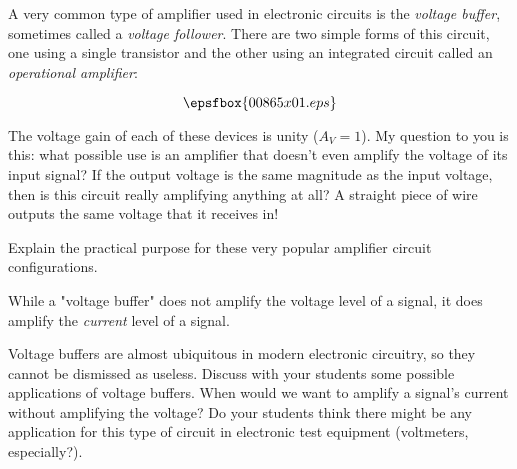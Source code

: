 

A very common type of amplifier used in electronic circuits is the {\it voltage buffer}, sometimes called a {\it voltage follower}.  There are two simple forms of this circuit, one using a single transistor and the other using an integrated circuit called an {\it operational amplifier}:

$$\epsfbox{00865x01.eps}$$

The voltage gain of each of these devices is unity ($A_V = 1$).  My question to you is this: what possible use is an amplifier that doesn't even amplify the voltage of its input signal?  If the output voltage is the same magnitude as the input voltage, then is this circuit really amplifying anything at all?  A straight piece of wire outputs the same voltage that it receives in!

Explain the practical purpose for these very popular amplifier circuit configurations.







While a "voltage buffer" does not amplify the voltage level of a signal, it does amplify the {\it current} level of a signal.







Voltage buffers are almost ubiquitous in modern electronic circuitry, so they cannot be dismissed as useless.  Discuss with your students some possible applications of voltage buffers.  When would we want to amplify a signal's current without amplifying the voltage?  Do your students think there might be any application for this type of circuit in electronic test equipment (voltmeters, especially?).



